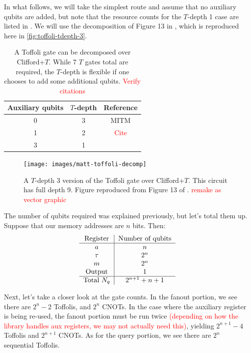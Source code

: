 \documentclass[a4paper,12pt]{article}
\newcommand\todo[1]{\textcolor{red}{#1}}
\begin{document}
In what follows, we will take the simplest route and assume that no auxiliary qubits are added, but note that the resource counts for the $T$-depth 1 case are listed in \cite{DiMatteo2020}. 
We will use the decomposition of Figure 13 in \cite{MITM}, which is reproduced here in \autoref{fig:toffoli-tdepth-3}.

\begin{table}
 \centering
  \captionsetup{width=.89\linewidth}
 \begin{tabular}{|c|c|c|}
  \hline
  Auxiliary qubits & $T$-depth & Reference \\ \hline
  0 & 3 & MITM \\ \hline
  1 & 2 & \todo{Cite} \\ \hline
  3 & 1 & \cite{Selinger2013} \\ \hline
 \end{tabular}
 \caption{A Toffoli gate can be decomposed over Clifford+$T$. 
 While 7 $T$ gates total are required, the $T$-depth is flexible if one chooses to add some additional qubits. \todo{Verify citations} }
 \label{tab:toffoli-tdepth}
\end{table}

\begin{figure}[h]
 \centering
 \captionsetup{width=.89\linewidth}
 \texttt{[image: images/matt-toffoli-decomp]}
 \caption{A $T$-depth 3 version of the Toffoli gate over Clifford+$T$. 
 This circuit has full depth 9. 
 Figure reproduced from Figure 13 of \cite{MITM}. \todo{remake as vector graphic}}
 \label{fig:toffoli-tdepth-3}
\end{figure}


The number of qubits required was explained previously, but let's total them up. 
Suppose that our memory addresses are $n$ bits. 
Then:
\begin{equation}
 \begin{tabular}{c|c}
  Register & Number  of qubits \\ \hline
  $a$ & $n$ \\
  $\tau$ & $2^n$ \\
  $m$ & $2^n$ \\
  Output & 1 \\ \hline
  Total $N_q$ & $2^{n+1} + n + 1$
 \end{tabular}
\end{equation} 

Next, let's take a closer look at the gate counts. 
In the fanout portion, we see there are $2^n - 2$ Toffolis, and $2^n$ CNOTs. 
In the case where the auxiliary register is being re-used, the fanout portion must be run twice \todo{(depending on how the library handles aux registers, we may not actually need this)}, yielding $2^{n+1} - 4$ Toffolis and $2^{n+1}$ CNOTs. 
As for the query portion, we see there are $2^n$ sequential Toffolis.
\end{document}
